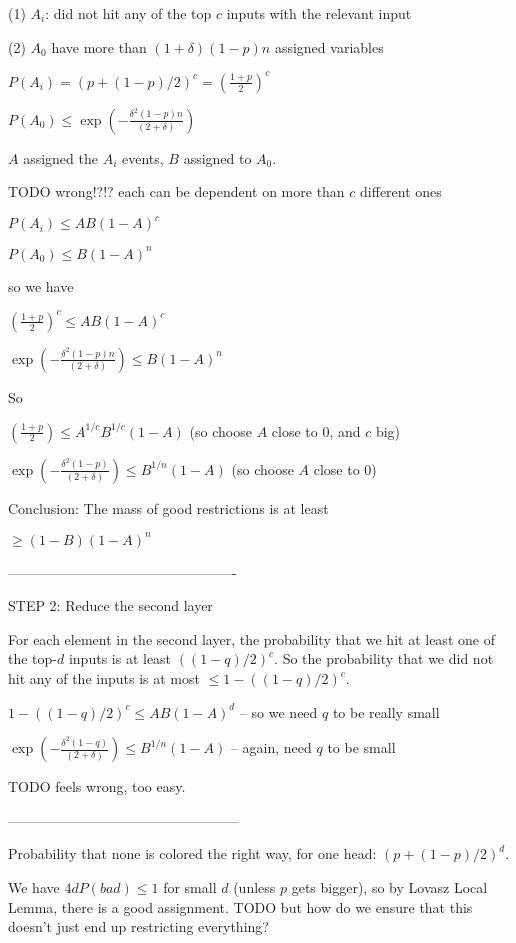 \documentclass[11pt,a4paper]{article}
\begin{document}
(1) $A_i$: did not hit any of the top $c$ inputs with the relevant input

(2) $A_0$ have more than $(1+\delta)(1-p)n$ assigned variables

$P(A_i) = (p+(1-p)/2)^c = \left(\frac{1+p}{2}\right)^c$

$P(A_0) \leq \exp(-\frac{\delta^2(1-p)n}{(2+\delta)})$

$A$ assigned the $A_i$ events, $B$ assigned to $A_0$.

TODO wrong!?!? each can be dependent on more than $c$ different ones

$P(A_i) \leq A B (1-A)^c$

$P(A_0) \leq B (1-A)^n$

so we have

$\left(\frac{1+p}{2}\right)^c \leq A B (1-A)^c$

$ \exp(-\frac{\delta^2(1-p)n}{(2+\delta)})  \leq B (1-A)^n$

So 

$\left(\frac{1+p}{2}\right) \leq A^{1/c} B^{1/c} (1-A)$ (so choose $A$ close to $0$, and $c$ big)

$ \exp(-\frac{\delta^2(1-p)}{(2+\delta)})  \leq B^{1/n} (1-A)$ (so choose $A$ close to $0$)

Conclusion: The mass of good restrictions is at least

$\geq (1-B)(1-A)^n$

-------------------------------------------------

STEP 2: Reduce the second layer

For each element in the second layer, the probability that we hit at least one of the top-$d$ inputs is at least $((1-q)/2)^c$.
So the probability that we did not hit any of the inputs is at most $\leq 1-((1-q)/2)^c$.

$1-((1-q)/2)^c \leq AB(1-A)^d$ -- so we need $q$ to be really small

$ \exp(-\frac{\delta^2(1-q)}{(2+\delta)})  \leq B^{1/n} (1-A)$ -- again, need $q$ to be small

TODO feels wrong, too easy.

--------------------------------------------------

Probability that none is colored the right way, for one head: $(p+(1-p)/2)^d$.

We have $4d P(bad) \leq 1$ for small $d$ (unless $p$ gets bigger), so by Lovasz Local Lemma, there is a good assignment. TODO but how do we ensure that this doesn't just end up restricting everything?
\end{document}

